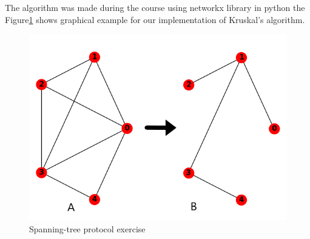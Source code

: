 The algorithm was made during the course using networkx library in python the Figure\ref{fig:STP} shows graphical example for our implementation of Kruskal's algorithm.

\begin{figure}[H]\label{}
	\centering
	\includegraphics[scale=0.5]{realTimeEthernet/Image/STP.png}
	\caption{Spanning-tree protocol exercise}
	\label{fig:STP}
\end{figure}
